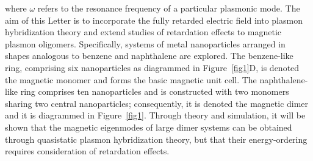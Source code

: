 \documentclass[journal=jpccck,manuscript=article]{achemso}
\begin{document}
where $\omega$ refers to the resonance frequency of a particular plasmonic mode. The aim of this Letter is to incorporate the fully retarded electric field into plasmon hybridization theory and extend studies of retardation effects to magnetic plasmon oligomers. Specifically, systems of metal nanoparticles arranged in shapes analogous to benzene and naphthalene are explored\cite{Cherqui2014}. The benzene-like ring, comprising six nanoparticles as diagrammed in Figure~\ref{fig1}D, is denoted the magnetic monomer and forms the basic magnetic unit cell. The naphthalene-like ring comprises ten nanoparticles and is constructed with two monomers sharing two central nanoparticles; consequently, it is denoted the magnetic dimer and it is diagrammed in Figure~\ref{fig1}. Through theory and simulation, it will be shown that the magnetic eigenmodes of large dimer systems can be obtained through quasistatic plasmon hybridization theory, but that their energy-ordering requires consideration of retardation effects.
\end{document}

